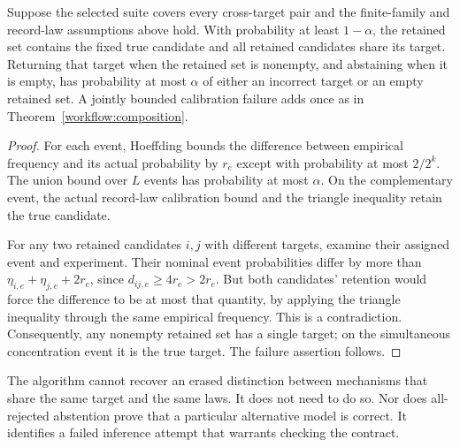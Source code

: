 \begin{theorem}\label{workflow:finiteerror}
Suppose the selected suite covers every cross-target pair and the finite-family and record-law assumptions above hold. With probability at least $1-\alpha$, the retained set contains the fixed true candidate and all retained candidates share its target. Returning that target when the retained set is nonempty, and abstaining when it is empty, has probability at most $\alpha$ of either an incorrect target or an empty retained set. A jointly bounded calibration failure adds once as in Theorem~\ref{workflow:composition}.
\end{theorem}
\begin{proof}
For each event, Hoeffding bounds the difference between empirical frequency and its actual probability by $r_e$ except with probability at most $2/2^k$. The union bound over $L$ events has probability at most $\alpha$. On the complementary event, the actual record-law calibration bound and the triangle inequality retain the true candidate.

For any two retained candidates $i,j$ with different targets, examine their assigned event and experiment. Their nominal event probabilities differ by more than $\eta_{i,e}+\eta_{j,e}+2r_e$, since $d_{ij,e}\ge4r_e>2r_e$. But both candidates' retention would force the difference to be at most that quantity, by applying the triangle inequality through the same empirical frequency. This is a contradiction. Consequently, any nonempty retained set has a single target; on the simultaneous concentration event it is the true target. The failure assertion follows.
\end{proof}
The algorithm cannot recover an erased distinction between mechanisms that share the same target and the same laws. It does not need to do so. Nor does all-rejected abstention prove that a particular alternative model is correct. It identifies a failed inference attempt that warrants checking the contract.


